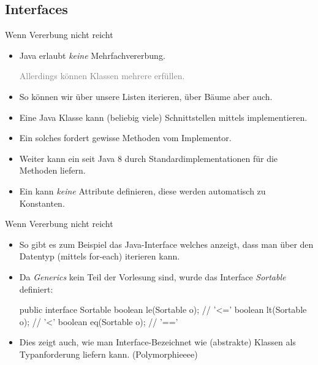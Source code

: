 \subsection{Interfaces}


\begin{frame}{Wenn Vererbung nicht reicht}
    \begin{itemize}[<+(1)->]
        \widei
        \item Java erlaubt \emph{keine} Mehrfachvererbung.\pause{}\par \textcolor{gray}{Allerdings können Klassen mehrere  erfüllen.}
        \item So können wir über unsere Listen iterieren,\pause{} über Bäume aber auch.
        \item Eine Java Klasse kann (beliebig viele) Schnittstellen mittels  implementieren.
        \item Ein solches  fordert gewisse Methoden vom Implementor.
        \item Weiter kann ein  seit Java \(8\) durch  Standardimplementationen für die Methoden liefern.
        \item Ein  kann \emph{keine} Attribute definieren, diese werden automatisch zu Konstanten.
    \end{itemize}
\end{frame}

\begin{frame}[fragile]{Wenn Vererbung nicht reicht}
    \begin{itemize}[<+(1)->]
        \widei
        \item So gibt es zum Beispiel das Java-Interface  welches anzeigt, dass man über den Datentyp (mittels for-each) iterieren kann.
        \item Da \emph{Generics} kein Teil der Vorlesung sind, wurde das Interface \emph{Sortable} definiert:\pause{}
\begin{plainjava}
public interface Sortable {
    boolean le(Sortable o); // '<='
    boolean lt(Sortable o); // '<'
    boolean eq(Sortable o); // '=='
}
\end{plainjava}
        \item Dies zeigt auch, wie man Interface-Bezeichnet wie (abstrakte) Klassen als Typanforderung liefern kann.\pause{} (Polymorphieeee)
    \end{itemize}
\end{frame}

